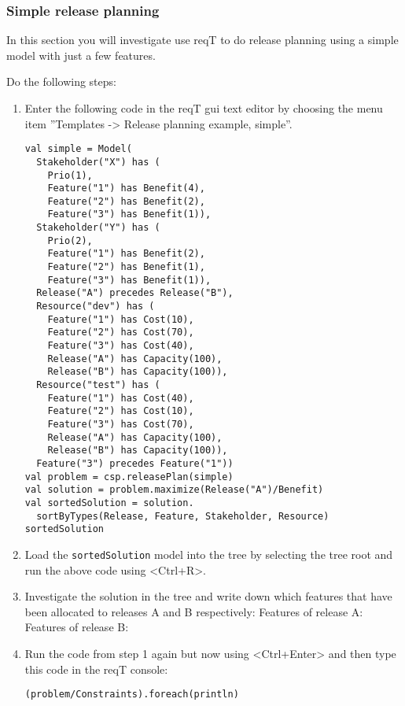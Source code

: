 \documentclass[11pt]{article}
\begin{document}
\subsubsection{Simple release planning}
In this section you will investigate use reqT to do release planning using a simple model with just a few features. 
\begin{framed}
\noindent Do the following steps: 

\begin{enumerate}
\item Enter the following code in the reqT gui text editor by choosing the menu item ''Templates -> Release planning example, simple''.

\begin{lstlisting}
val simple = Model(
  Stakeholder("X") has (
    Prio(1),
    Feature("1") has Benefit(4),
    Feature("2") has Benefit(2),
    Feature("3") has Benefit(1)),
  Stakeholder("Y") has (
    Prio(2),
    Feature("1") has Benefit(2),
    Feature("2") has Benefit(1),
    Feature("3") has Benefit(1)),
  Release("A") precedes Release("B"),  
  Resource("dev") has (
    Feature("1") has Cost(10),
    Feature("2") has Cost(70),
    Feature("3") has Cost(40),
    Release("A") has Capacity(100),
    Release("B") has Capacity(100)),
  Resource("test") has (
    Feature("1") has Cost(40),
    Feature("2") has Cost(10),
    Feature("3") has Cost(70),
    Release("A") has Capacity(100),
    Release("B") has Capacity(100)),
  Feature("3") precedes Feature("1"))
val problem = csp.releasePlan(simple)
val solution = problem.maximize(Release("A")/Benefit)
val sortedSolution = solution.
  sortByTypes(Release, Feature, Stakeholder, Resource)
sortedSolution
\end{lstlisting}
\item Load the \verb+sortedSolution+ model into the tree by selecting the tree root and run the above code using <Ctrl+R>. 
\item Investigate the solution in the tree and write down which features that have been allocated to releases A and B respectively:
\newline Features of release A:
\vspace{1em}
\newline Features of release B:
\vspace{1em}
\item Run the code from step 1 again but now using <Ctrl+Enter> and then type this code in the reqT console:
\begin{lstlisting}
(problem/Constraints).foreach(println)

\end{lstlisting}
\end{enumerate}
\end{framed}
\end{document}
